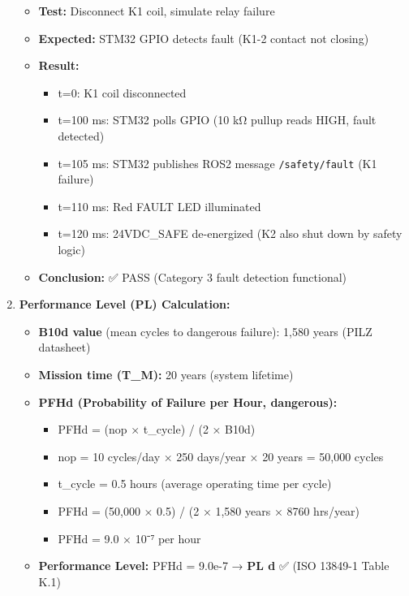 \documentclass[
]{article}
\providecommand{\tightlist}{%
  \setlength{\itemsep}{0pt}\setlength{\parskip}{0pt}}
\begin{document}
\begin{enumerate}
  \begin{itemize}
  \tightlist
  \item
    \textbf{Test:} Disconnect K1 coil, simulate relay failure
  \item
    \textbf{Expected:} STM32 GPIO detects fault (K1-2 contact not
    closing)
  \item
    \textbf{Result:}

    \begin{itemize}
    \tightlist
    \item
      t=0: K1 coil disconnected
    \item
      t=100 ms: STM32 polls GPIO (10 kΩ pullup reads HIGH, fault
      detected)
    \item
      t=105 ms: STM32 publishes ROS2 message \texttt{/safety/fault} (K1
      failure)
    \item
      t=110 ms: Red FAULT LED illuminated
    \item
      t=120 ms: 24VDC\_SAFE de-energized (K2 also shut down by safety
      logic)
    \end{itemize}
  \item
    \textbf{Conclusion:} ✅ PASS (Category 3 fault detection functional)
  \end{itemize}
\item
  \textbf{Performance Level (PL) Calculation:}

  \begin{itemize}
  \tightlist
  \item
    \textbf{B10d value} (mean cycles to dangerous failure): 1,580 years
    (PILZ datasheet)
  \item
    \textbf{Mission time (T\_M):} 20 years (system lifetime)
  \item
    \textbf{PFHd (Probability of Failure per Hour, dangerous):}

    \begin{itemize}
    \tightlist
    \item
      PFHd = (nop × t\_cycle) / (2 × B10d)
    \item
      nop = 10 cycles/day × 250 days/year × 20 years = 50,000 cycles
    \item
      t\_cycle = 0.5 hours (average operating time per cycle)
    \item
      PFHd = (50,000 × 0.5) / (2 × 1,580 years × 8760 hrs/year)
    \item
      PFHd = 9.0 × 10⁻⁷ per hour
    \end{itemize}
  \item
    \textbf{Performance Level:} PFHd = 9.0e-7 → \textbf{PL d} ✅ (ISO
    13849-1 Table K.1)
  \end{itemize}
\end{enumerate}
\end{document}

